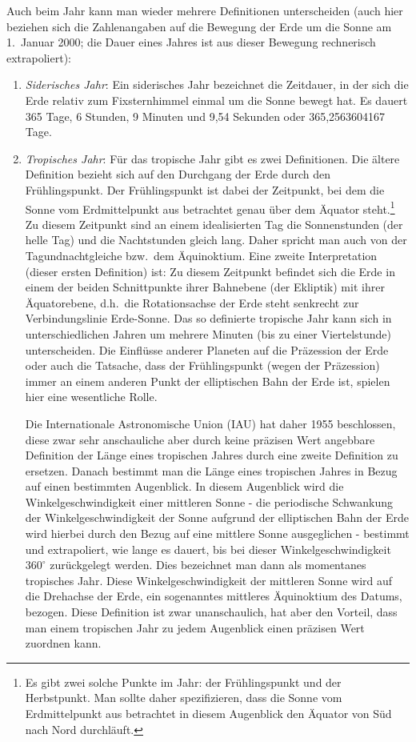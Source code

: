 Auch beim Jahr kann man wieder mehrere Definitionen unterscheiden (auch hier beziehen sich
die Zahlenangaben auf die Bewegung der Erde um die Sonne am 1.\ Januar 2000; die Dauer
eines Jahres ist aus dieser Bewegung rechnerisch extrapoliert):
\begin{enumerate}
\item
\textit{Siderisches Jahr}:
Ein siderisches Jahr bezeichnet die Zeitdauer, in der sich die Erde relativ zum Fixsternhimmel
einmal um die Sonne bewegt hat. Es dauert 365 Tage, 6 Stunden, 9 Minuten und 9,54
Sekunden oder 365,2563604167 Tage. 
\item
\textit{Tropisches Jahr}:
F\"ur das tropische Jahr gibt es zwei Definitionen. Die \"altere Definition bezieht sich auf den
Durchgang der Erde durch den Fr\"uhlingspunkt. Der Fr\"uhlingspunkt ist
dabei der Zeitpunkt, bei dem die Sonne vom Erdmittelpunkt aus betrachtet genau \"uber
dem \"Aquator steht.\footnote{Es gibt zwei solche Punkte im Jahr: der Fr\"uhlingspunkt und
der Herbstpunkt. Man sollte daher spezifizieren, dass die Sonne vom Erdmittelpunkt aus
betrachtet in diesem Augenblick den \"Aquator von S\"ud nach Nord durchl\"auft.} 
Zu diesem Zeitpunkt sind an einem idealisierten Tag die Sonnenstunden
(der helle Tag) und die Nachtstunden gleich lang. Daher spricht man auch von der
Tagundnachtgleiche bzw.\ dem \"Aquinoktium. Eine zweite Interpretation 
(dieser ersten Definition) ist: Zu diesem Zeitpunkt befindet sich die
Erde in einem der beiden Schnittpunkte ihrer Bahnebene (der Ekliptik) mit ihrer \"Aquatorebene,
d.h.\ die Rotationsachse der Erde steht senkrecht zur Verbindungslinie Erde-Sonne.  
Das so definierte tropische Jahr kann sich in unterschiedlichen Jahren um mehrere Minuten
(bis zu einer Viertelstunde) unterscheiden. Die Einfl\"usse anderer Planeten auf die Pr\"azession der
Erde oder auch die Tatsache, dass der Fr\"uhlingspunkt (wegen der Pr\"azession) immer an einem
anderen Punkt der elliptischen Bahn der Erde ist, spielen hier eine wesentliche Rolle.

Die Internationale Astronomische Union (IAU) hat daher 1955 beschlossen, diese zwar sehr
anschauliche aber durch keine pr\"azisen Wert angebbare Definition der L\"ange eines tropischen
Jahres durch eine zweite Definition zu ersetzen. Danach bestimmt man die L\"ange eines tropischen
Jahres in Bezug auf einen bestimmten Augenblick. In diesem Augenblick wird die Winkelgeschwindigkeit
einer mittleren Sonne - die periodische Schwankung der Winkelgeschwindigkeit der Sonne aufgrund
der elliptischen Bahn der Erde wird hierbei durch den Bezug auf eine mittlere Sonne ausgeglichen - bestimmt
und extrapoliert, wie lange es dauert, bis bei dieser Winkelgeschwindigkeit $360^\circ$ zur\"uckgelegt
werden. Dies bezeichnet man dann als momentanes tropisches Jahr. Diese Winkelgeschwindigkeit 
der mittleren Sonne wird auf die Drehachse der Erde, ein sogenanntes \glqq mittleres \"Aquinoktium
des Datums\grqq, bezogen. Diese Definition ist zwar unanschaulich, hat aber den Vorteil, dass man
einem tropischen Jahr zu jedem Augenblick einen pr\"azisen Wert zuordnen kann.   


\end{enumerate}
